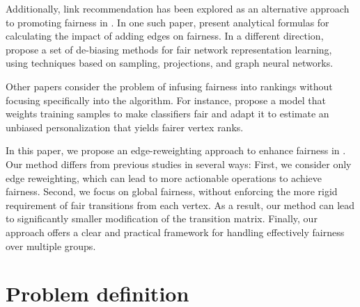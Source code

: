 \documentclass[sigconf, anonymous, review]{acmart}
\begin{document}
Additionally, link recommendation has been explored as an alternative approach to promoting fairness in \pagerank. 
In one such paper, \citet{tsioutsiouliklis_link_2022} present analytical formulas 
for calculating the impact of adding edges on fairness.
In a different direction, \citet{zeng_fair_2021} propose a set of de-biasing methods
for fair network representation learning, using techniques based on 
sampling, projections, and graph neural networks.

Other papers consider the problem of infusing fairness into rankings
without focusing specifically into the \pagerank algorithm.
For instance, \citet{krasanakis_applying_2021} propose a model that 
weights training samples to make classifiers fair and 
adapt it to estimate an unbiased personalization that yields fairer vertex ranks. 

In this paper, we propose an edge-reweighting approach to enhance fairness in \pagerank.
Our method differs from previous studies in several ways: 
First, we consider only edge reweighting, which can lead to more actionable operations to achieve fairness.
Second, we focus on global fairness, 
without enforcing the more rigid requirement of fair transitions from each vertex. 
As a result, our method can lead to significantly smaller modification of the transition matrix.
Finally, our approach offers a clear and practical framework for handling effectively
fairness over multiple groups.





\section{Problem definition}

\end{document}
